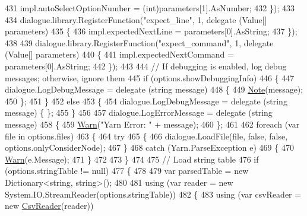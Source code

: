 \begin{DoxyCode}
431                 impl.autoSelectOptionNumber = (int)parameters[1].AsNumber;
432             \});
433 
434             dialogue.library.RegisterFunction(\textcolor{stringliteral}{"expect\_line"}, 1, delegate (Value[] parameters)
435             \{
436                 impl.expectedNextLine = parameters[0].AsString;
437             \});
438 
439             dialogue.library.RegisterFunction(\textcolor{stringliteral}{"expect\_command"}, 1, delegate (Value[] parameters)
440             \{
441                 impl.expectedNextCommand = parameters[0].AsString;
442             \});
443 
444             \textcolor{comment}{// If debugging is enabled, log debug messages; otherwise, ignore them}
445             \textcolor{keywordflow}{if} (options.showDebuggingInfo)
446             \{
447                 dialogue.LogDebugMessage = delegate (\textcolor{keywordtype}{string} message)
448                 \{
449                     \hyperlink{a00172_a939cc9e943c574b36c6af93e9c772702}{Note}(message);
450                 \};
451             \}
452             \textcolor{keywordflow}{else}
453             \{
454                 dialogue.LogDebugMessage = delegate (\textcolor{keywordtype}{string} message) \{ \};
455             \}
456 
457             dialogue.LogErrorMessage = delegate (\textcolor{keywordtype}{string} message)
458             \{
459                 \hyperlink{a00172_a979bb6f049b6c5294f745a19e24ddd9d}{Warn}(\textcolor{stringliteral}{"Yarn Error: "} + message);
460             \};
461 
462             \textcolor{keywordflow}{foreach} (var file \textcolor{keywordflow}{in} options.files)
463             \{
464                 \textcolor{keywordflow}{try}
465                 \{
466                     dialogue.LoadFile(file, \textcolor{keyword}{false}, \textcolor{keyword}{false}, options.onlyConsiderNode);
467                 \}
468                 \textcolor{keywordflow}{catch} (Yarn.ParseException e)
469                 \{
470                     \hyperlink{a00172_a979bb6f049b6c5294f745a19e24ddd9d}{Warn}(e.Message);
471                 \}
472 
473             \}
474 
475             \textcolor{comment}{// Load string table}
476             \textcolor{keywordflow}{if} (options.stringTable != null)
477             \{
478 
479                 var parsedTable = \textcolor{keyword}{new} Dictionary<string, string>();
480 
481                 \textcolor{keyword}{using} (var reader = \textcolor{keyword}{new} System.IO.StreamReader(options.stringTable))
482                 \{
483                     \textcolor{keyword}{using} (var csvReader = \textcolor{keyword}{new} \hyperlink{a00074}{CsvReader}(reader))

\end{DoxyCode}
